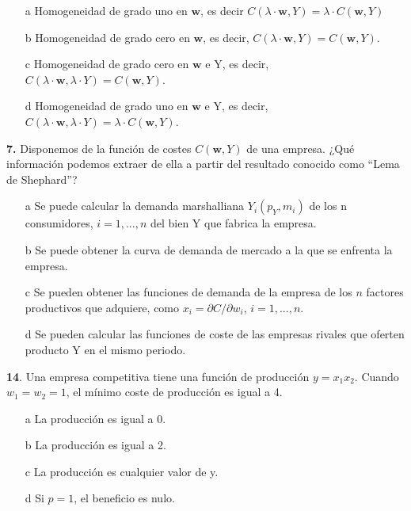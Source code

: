 \documentclass{nuevotema}
\begin{document}
\begin{itemize}
	\item[a] Homogeneidad de grado uno en $\textbf{w}$, es decir $C(\lambda \cdot \textbf{w}, Y) = \lambda \cdot C(\textbf{w}, Y)$
	\item[b] Homogeneidad de grado cero en $\textbf{w}$, es decir, $C(\lambda \cdot \textbf{w}, Y) = C(\textbf{w}, Y)$.
	\item[c] Homogeneidad de grado cero en $\textbf{w}$ e Y, es decir, $C (\lambda \cdot \textbf{w}, \lambda \cdot Y) = C(\textbf{w}, Y)$.
	\item[d] Homogeneidad de grado uno en $\textbf{w}$ e Y, es decir, $C(\lambda \cdot \textbf{w}, \lambda \cdot Y) = \lambda \cdot C(\textbf{w}, Y)$.
\end{itemize}

\textbf{7.} Disponemos de la función de costes $C(\textbf{w}, Y)$ de una empresa. ¿Qué información podemos extraer de ella a partir del resultado conocido como ``Lema de Shephard''?

\begin{itemize}
	\item[a] Se puede calcular la demanda marshalliana $Y_i (p_Y, m_i)$ de los n consumidores, $i = 1, ..., n$ del bien Y que fabrica la empresa.
	\item[b] Se puede obtener la curva de demanda de mercado a la que se enfrenta la empresa.
	\item[c] Se pueden obtener las funciones de demanda de la empresa de los $n$ factores productivos que adquiere, como $x_i = \partial C / \partial w_i$, $i=1,...,n$.
	\item[d] Se pueden calcular las funciones de coste de las empresas rivales que oferten producto Y en el mismo periodo.
\end{itemize}


\textbf{14}. Una empresa competitiva tiene una función de producción $y=x_1 x_2$. Cuando $w_1=w_2 = 1$, el mínimo coste de producción es igual a 4.

\begin{enumerate}
	\item[a] La producción es igual a 0.
	\item[b] La producción es igual a 2.
	\item[c] La producción es cualquier valor de y.
	\item[d] Si $p=1$, el beneficio es nulo.
\end{enumerate}
\end{document}

